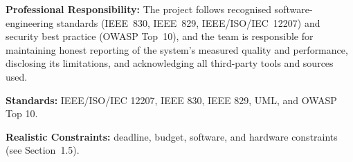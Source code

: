 \documentclass[12pt,a4paper,oneside]{report}
\begin{document}
\vspace{0.4em}
\noindent\textbf{Professional Responsibility:} The project follows recognised software-engineering standards (IEEE~830, IEEE~829, IEEE/ISO/IEC~12207) and security best practice (OWASP Top~10), and the team is responsible for maintaining honest reporting of the system's measured quality and performance, disclosing its limitations, and acknowledging all third-party tools and sources used.

\vspace{0.4em}
\noindent\textbf{Standards:} IEEE/ISO/IEC 12207, IEEE 830, IEEE 829, UML, and OWASP Top 10.

\vspace{0.4em}
\noindent\textbf{Realistic Constraints:} deadline, budget, software, and hardware constraints (see Section~1.5).
\end{document}
